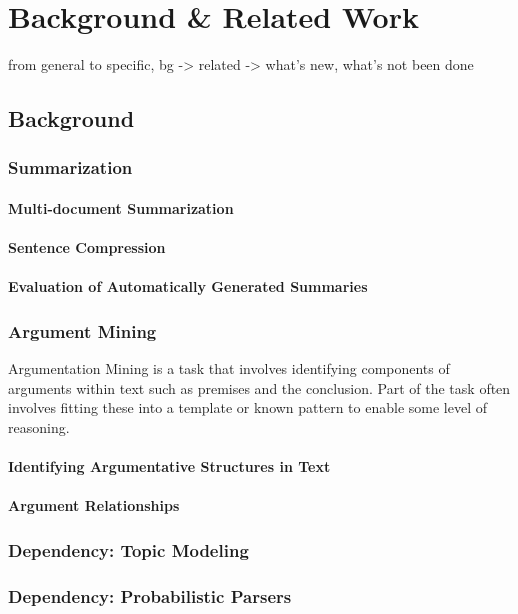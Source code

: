 \chapter{Background \& Related Work\label{chap:background-related}}
  from general to specific, bg -> related -> what's new, what's not been done
  \section{Background}
    \subsection{Summarization}
      \subsubsection{Multi-document Summarization}
      \subsubsection{Sentence Compression}
      \subsubsection{Evaluation of Automatically Generated Summaries}
    \subsection{Argument Mining}
      Argumentation Mining is a task that involves identifying components of arguments within text such as premises and the conclusion. Part of the task often involves fitting these into a template or known pattern to enable some level of reasoning.
      \subsubsection{Identifying Argumentative Structures in Text}
      \subsubsection{Argument Relationships}
    \subsection{Dependency: Topic Modeling}
    \subsection{Dependency: Probabilistic Parsers}
